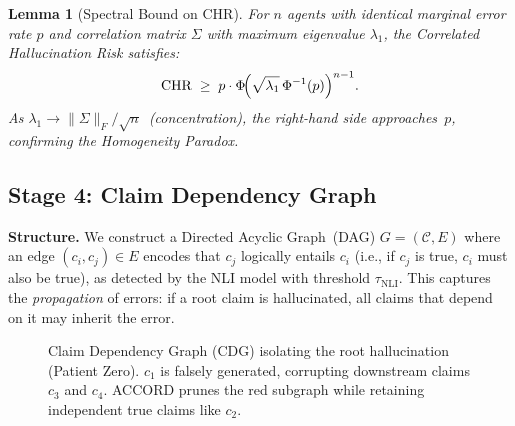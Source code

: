 \documentclass[conference]{IEEEtran}
\newtheorem{lemma}{Lemma}
\begin{document}
\begin{lemma}[Spectral Bound on CHR]
\label{lem:spectral}
For $n$ agents with identical marginal error rate $p$ and
correlation matrix $\Sigma$ with maximum eigenvalue $\lambda_1$,
the Correlated Hallucination Risk satisfies:
\begin{equation}
  \mathrm{CHR} \;\geq\;
  p \cdot \Phi\!\Bigl(\sqrt{\lambda_1}\,\Phi^{-1}(p)\Bigr)^{n-1}.
  \label{eq:spectral_bound}
\end{equation}
As $\lambda_1 \to \|\Sigma\|_F / \sqrt{n}$~(concentration),
the right-hand side approaches~$p$, confirming the
Homogeneity Paradox.
\end{lemma}

\subsection{Stage 4: Claim Dependency Graph}
\label{sec:cdg}

\textbf{Structure.}
We construct a Directed Acyclic Graph~(DAG)
$G = (\mathcal{C}, E)$ where an edge $(c_i, c_j) \in E$
encodes that $c_j$ logically entails $c_i$
(i.e., if $c_j$ is true, $c_i$ must also be true), as detected
by the NLI model with threshold $\tau_\text{NLI}$.
This captures the \emph{propagation} of errors: if a root claim
is hallucinated, all claims that depend on it may inherit
the error.

\begin{figure}[t]
  \centering
  \caption{Claim Dependency Graph (CDG) isolating the root hallucination (Patient Zero). $c_1$ is falsely generated, corrupting downstream claims $c_3$ and $c_4$. ACCORD prunes the red subgraph while retaining independent true claims like $c_2$.}
  \label{fig:cdg}
\end{figure}
\end{document}
